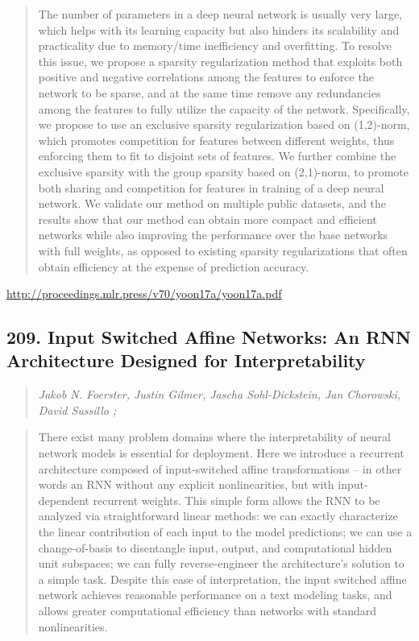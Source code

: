 \documentclass{article}
\begin{document}
\begin{quote}
    The number of parameters in a deep neural network is usually very large, which helps with its learning capacity but also hinders its scalability and practicality due to memory/time inefficiency and overfitting. To resolve this issue, we propose a sparsity regularization method that exploits both positive and negative correlations among the features to enforce the network to be sparse, and at the same time remove any redundancies among the features to fully utilize the capacity of the network. Specifically, we propose to use an exclusive sparsity regularization based on (1,2)-norm, which promotes competition for features between different weights, thus enforcing them to fit to disjoint sets of features. We further combine the exclusive sparsity with the group sparsity based on (2,1)-norm, to promote both sharing and competition for features in training of a deep neural network. We validate our method on multiple public datasets, and the results show that our method can obtain more compact and efficient networks while also improving the performance over the base networks with full weights, as opposed to existing sparsity regularizations that often obtain efficiency at the expense of prediction accuracy.  \end{quote}

\href{http://proceedings.mlr.press/v70/yoon17a/yoon17a.pdf}{http://proceedings.mlr.press/v70/yoon17a/yoon17a.pdf}

\subsection{209. Input Switched Affine Networks: An RNN Architecture Designed for Interpretability}

\begin{quote}
\footnotesize{\textit{Jakob N. Foerster, Justin Gilmer, Jascha Sohl-Dickstein, Jan Chorowski, David Sussillo ;}}
\end{quote}

\begin{quote}
    There exist many problem domains where the interpretability of neural network models is essential for deployment. Here we introduce a recurrent architecture composed of input-switched affine transformations – in other words an RNN without any explicit nonlinearities, but with input-dependent recurrent weights. This simple form allows the RNN to be analyzed via straightforward linear methods: we can exactly characterize the linear contribution of each input to the model predictions; we can use a change-of-basis to disentangle input, output, and computational hidden unit subspaces; we can fully reverse-engineer the architecture’s solution to a simple task. Despite this ease of interpretation, the input switched affine network achieves reasonable performance on a text modeling tasks, and allows greater computational efficiency than networks with standard nonlinearities.  \end{quote}
\end{document}

